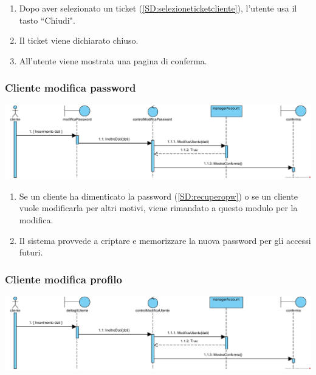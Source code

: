 \documentclass[12pt]{article}
\begin{document}
\begin{enumerate}
\item Dopo aver selezionato un ticket (\ref{SD:selezioneticketcliente}), l'utente usa il tasto ``Chiudi".
\item Il ticket viene dichiarato chiuso.
\item All'utente viene mostrata una pagina di conferma.
\end{enumerate}

\subsubsection{Cliente modifica password}
\label{SD:modificapw}

\begin{center}
\includegraphics[width=\textwidth]{SequenceDiagram/ClientePasswordModifica}
\end{center}

\begin{enumerate}
\item Se un cliente ha dimenticato la password (\ref{SD:recuperopw}) o se un cliente vuole modificarla per altri motivi, viene rimandato a questo modulo per la modifica.
\item Il sistema provvede a criptare e memorizzare la nuova password per gli accessi futuri.
\end{enumerate}

\subsubsection{Cliente modifica profilo}
\label{SD:modificaprofilo}
\begin{center}
\includegraphics[width=\textwidth]{SequenceDiagram/ClienteProfiloModifica}
\end{center}
\end{document}
